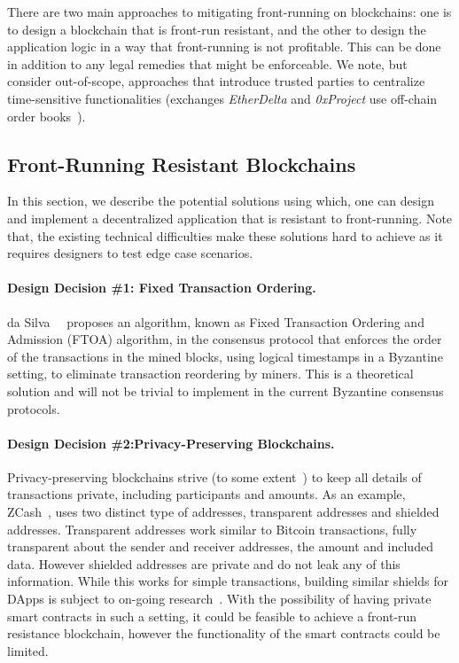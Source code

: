 There are two main approaches to mitigating front-running on blockchains: one is to design a blockchain that is front-run resistant, and the other to design the application logic in a way that front-running is not profitable. This can be done in addition to any legal remedies that might be enforceable. We note, but consider out-of-scope, approaches that introduce trusted parties to centralize time-sensitive functionalities (\eg exchanges \textit{EtherDelta} and \textit{0xProject} use off-chain order books~\cite{warren20170x,0xfrontrunning:online}). 



\subsection{Front-Running Resistant Blockchains}
In this section, we describe the potential solutions using which, one can design and implement a decentralized application that is resistant to front-running. Note that, the existing technical difficulties make these solutions hard to achieve as it requires designers to test edge case scenarios. 

\paragraph{Design Decision \#1: Fixed Transaction Ordering.} da Silva~\etal~\cite{fixedordering2018silva} proposes an algorithm, known as Fixed Transaction Ordering and Admission (FTOA) algorithm, in the consensus protocol that enforces the order of the transactions in the mined blocks, using logical timestamps in a Byzantine setting, to eliminate transaction reordering by miners. This is a theoretical solution and will not be trivial to implement in the current Byzantine consensus protocols.

\paragraph{Design Decision \#2:Privacy-Preserving Blockchains.} Privacy-preserving blockchains strive (to some extent~\cite{miller2017empirical, kappos2018empirical}) to keep all details of transactions private, including participants and amounts. As an example, ZCash~\cite{hopwood2016zcash}, uses two distinct type of addresses, transparent addresses and shielded addresses. Transparent addresses work similar to Bitcoin transactions, fully transparent about the sender and receiver addresses, the amount and included data. However shielded addresses are private and do not leak any of this information. While this works for simple transactions, building similar shields for DApps is subject to on-going research~\cite{kosba2016hawk}. With the possibility of having private smart contracts in such a setting, it could be feasible to achieve a front-run resistance blockchain, however the functionality of the smart contracts could be limited. 


